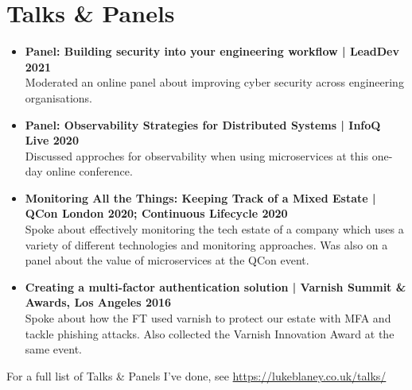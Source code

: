 \documentclass[a4paper]{article}
\begin{document}
\section*{Talks \& Panels}
\begin{itemize}

\item{\bf Panel: Building security into your engineering workflow | LeadDev 2021}\\
Moderated an online panel about improving cyber security across engineering organisations.
\item{\bf Panel: Observability Strategies for Distributed Systems | InfoQ Live 2020}\\
Discussed approches for observability when using microservices at this one-day online conference.
\item{\bf Monitoring All the Things: Keeping Track of a Mixed Estate | QCon London 2020; Continuous Lifecycle 2020}\\
Spoke about effectively monitoring the tech estate of a company which uses a variety of different technologies and monitoring approaches.  Was also on a panel about the value of microservices at the QCon event.
\item{\bf Creating a multi-factor authentication solution | Varnish Summit \& Awards, Los Angeles 2016}\\
Spoke about how the FT used varnish to protect our estate with MFA and tackle phishing attacks.  Also collected the Varnish Innovation Award at the same event.
\end{itemize}
For a full list of Talks \& Panels I've done, see \url{https://lukeblaney.co.uk/talks/}
\end{document}

